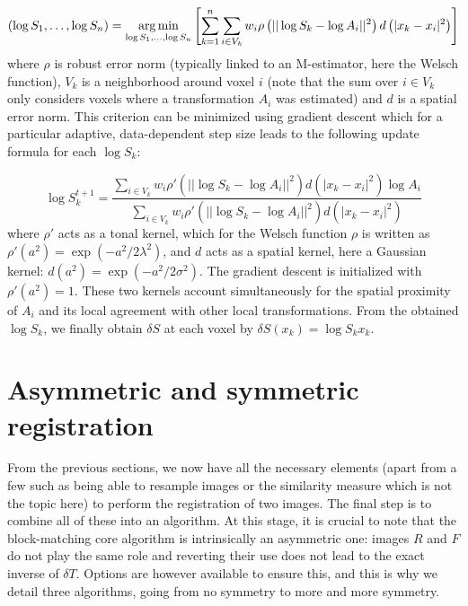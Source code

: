 \documentclass[a4paper]{article}
\def\argmin{\operatornamewithlimits{arg\,min}}
\begin{document}
\begin{equation}
	\left( \log S_1,\ldots,\log S_n \right) = \argmin_{\log S_1,\ldots,\log S_n} \left[ \sum_{k=1}^n \sum_{i \in V_k} w_i \rho\left( || \log S_k - \log A_i||^2 \right) d\left( |x_k - x_i|^2 \right) \right]
\end{equation}
where $\rho$ is robust error norm (typically linked to an M-estimator, here the Welsch function), $V_k$ is a neighborhood around voxel $i$ (note that the sum over $i \in V_k$ only considers voxels where a transformation $A_i$ was estimated) and $d$ is a spatial error norm. This criterion can be minimized using gradient descent which for a particular adaptive, data-dependent step size leads to the following update formula for each $\log S_k$:

\begin{equation}
	\log S_k^{t+1} = \frac{\sum_{i \in V_k} w_i \rho'\left( || \log S_k - \log A_i||^2 \right)d\left( |x_k - x_i|^2 \right) \log A_i}{\sum_{i \in V_k} w_i \rho'\left( || \log S_k - \log A_i||^2 \right)d\left( |x_k - x_i|^2 \right)}
\end{equation}
where $\rho'$ acts as a tonal kernel, which for the Welsch function $\rho$ is written as $\rho'(a^2) = \exp\left(-a^2 / 2\lambda^2\right)$, and $d$ acts as a spatial kernel, here a Gaussian kernel: $d(a^2) = \exp\left(- a^2 / 2\sigma^2\right)$. The gradient descent is initialized with $\rho'(a^2) = 1$. These two kernels account simultaneously for the spatial proximity of $A_i$ and its local agreement with other local transformations. From the obtained $\log S_k$, we finally obtain $\delta S$ at each voxel by $\delta S(x_k) = \log S_k x_k$.


\section{Asymmetric and symmetric registration}
\label{sec:reg-algorithms}

From the previous sections, we now have all the necessary elements (apart from a few such as being able to resample images or the similarity measure which is not the topic here) to perform the registration of two images. The final step is to combine all of these into an algorithm. At this stage, it is crucial to note that the block-matching core algorithm is intrinsically an asymmetric one: images $R$ and $F$ do not play the same role and reverting their use does not lead to the exact inverse of $\delta T$. Options are however available to ensure this, and this is why we detail three algorithms, going from no symmetry to more and more symmetry.
\end{document}
